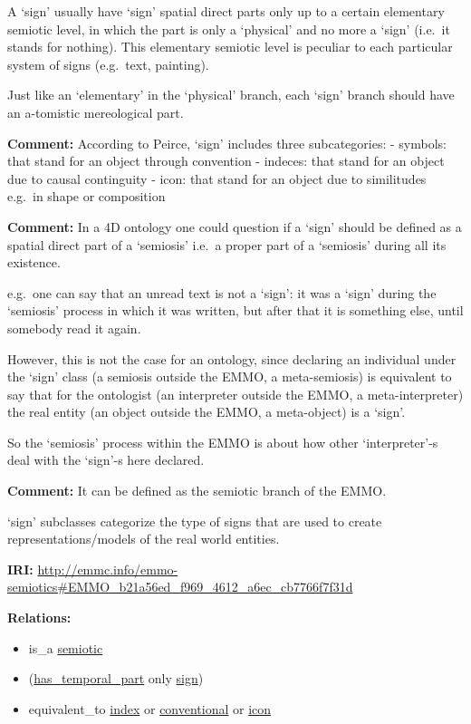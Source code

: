 \documentclass[a4paper,]{report}
\providecommand{\tightlist}{%
  \setlength{\itemsep}{0pt}\setlength{\parskip}{0pt}}
\begin{document}
A `sign' usually have `sign' spatial direct parts only up to a certain
elementary semiotic level, in which the part is only a `physical' and no
more a `sign' (i.e.~it stands for nothing). This elementary semiotic
level is peculiar to each particular system of signs (e.g.~text,
painting).

Just like an `elementary' in the `physical' branch, each `sign' branch
should have an a-tomistic mereological part.

\textbf{Comment:} According to Peirce, `sign' includes three
subcategories: - symbols: that stand for an object through convention -
indeces: that stand for an object due to causal continguity - icon: that
stand for an object due to similitudes e.g.~in shape or composition

\textbf{Comment:} In a 4D ontology one could question if a `sign' should
be defined as a spatial direct part of a `semiosis' i.e.~a proper part
of a `semiosis' during all its existence.

e.g.~one can say that an unread text is not a `sign': it was a `sign'
during the `semiosis' process in which it was written, but after that it
is something else, until somebody read it again.

However, this is not the case for an ontology, since declaring an
individual under the `sign' class (a semiosis outside the EMMO, a
meta-semiosis) is equivalent to say that for the ontologist (an
interpreter outside the EMMO, a meta-interpreter) the real entity (an
object outside the EMMO, a meta-object) is a `sign'.

So the `semiosis' process within the EMMO is about how other
`interpreter'-s deal with the `sign'-s here declared.

\textbf{Comment:} It can be defined as the semiotic branch of the EMMO.

`sign' subclasses categorize the type of signs that are used to create
representations/models of the real world entities.

\textbf{IRI:}
\url{http://emmc.info/emmo-semiotics\#EMMO_b21a56ed_f969_4612_a6ec_cb7766f7f31d}

\textbf{Relations:}

\begin{itemize}
\tightlist
\item
  is\_a \protect\hyperlink{semiotic}{semiotic}
\item
  (\protect\hyperlink{has_temporal_part}{has\_temporal\_part} only
  \protect\hyperlink{sign}{sign})
\item
  equivalent\_to \protect\hyperlink{index}{index} or
  \protect\hyperlink{conventional}{conventional} or
  \protect\hyperlink{icon}{icon}
\end{itemize}
\end{document}
